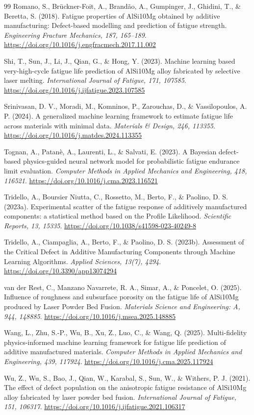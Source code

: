 \documentclass[12pt,a4paper]{article}
\begin{document}
\begin{thebibliography}{99}
Romano, S., Brückner-Foit, A., Brandão, A., Gumpinger, J., Ghidini, T., \& Beretta, S. (2018). Fatigue properties of AlSi10Mg obtained by additive manufacturing: Defect-based modelling and prediction of fatigue strength. \emph{Engineering Fracture Mechanics, 187, 165–189}. \url{https://doi.org/10.1016/j.engfracmech.2017.11.002}

Shi, T., Sun, J., Li, J., Qian, G., \& Hong, Y. (2023). Machine learning based very-high-cycle fatigue life prediction of AlSi10Mg alloy fabricated by selective laser melting. \emph{International Journal of Fatigue, 171, 107585}. \url{https://doi.org/10.1016/j.ijfatigue.2023.107585}

Srinivasan, D. V., Moradi, M., Komninos, P., Zarouchas, D., \& Vassilopoulos, A. P. (2024). A generalized machine learning framework to estimate fatigue life across materials with minimal data. \emph{Materials \& Design, 246, 113355}. \url{https://doi.org/10.1016/j.matdes.2024.113355}

Tognan, A., Patanè, A., Laurenti, L., \& Salvati, E. (2023). A Bayesian defect-based physics-guided neural network model for probabilistic fatigue endurance limit evaluation. \emph{Computer Methods in Applied Mechanics and Engineering, 418, 116521}. \url{https://doi.org/10.1016/j.cma.2023.116521}

Tridello, A., Boursier Niutta, C., Rossetto, M., Berto, F., \& Paolino, D. S. (2023a). Experimental scatter of the fatigue response of additively manufactured components: a statistical method based on the Profile Likelihood. \emph{Scientific Reports, 13, 15335}. \url{https://doi.org/10.1038/s41598-023-40249-8}

Tridello, A., Ciampaglia, A., Berto, F., \& Paolino, D. S. (2023b). Assessment of the Critical Defect in Additive Manufacturing Components through Machine Learning Algorithms. \emph{Applied Sciences, 13(7), 4294}. \url{https://doi.org/10.3390/app13074294}

van der Rest, C., Manzano Navarrete, R. A., Simar, A., \& Poncelet, O. (2025). Influence of roughness and subsurface porosity on the fatigue life of AlSi10Mg produced by Laser Powder Bed Fusion. \emph{Materials Science and Engineering: A, 944, 148885}. \url{https://doi.org/10.1016/j.msea.2025.148885}

Wang, L., Zhu, S.-P., Wu, B., Xu, Z., Luo, C., \& Wang, Q. (2025). Multi-fidelity physics-informed machine learning framework for fatigue life prediction of additive manufactured materials. \emph{Computer Methods in Applied Mechanics and Engineering, 439, 117924}. \url{https://doi.org/10.1016/j.cma.2025.117924}

Wu, Z., Wu, S., Bao, J., Qian, W., Karabal, S., Sun, W., \& Withers, P. J. (2021). The effect of defect population on the anisotropic fatigue resistance of AlSi10Mg alloy fabricated by laser powder bed fusion. \emph{International Journal of Fatigue, 151, 106317}. \url{https://doi.org/10.1016/j.ijfatigue.2021.106317}
\end{thebibliography}
\clearpage
\end{document}
